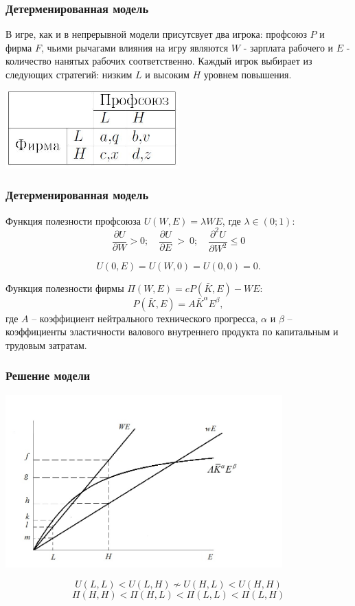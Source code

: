 \documentclass {beamer}
\begin{document}
\begin{frame}
	
	\frametitle{Детерменированная модель}
	
	В игре, как и в непрерывной модели присутсвует два игрока: профсоюз $P$ и фирма $F$, чьими рычагами влияния на игру являются $W$ - зарплата рабочего и $E$ - количество нанятых рабочих соответственно.
	Каждый игрок выбирает из следующих стратегий: низким $L$ и высоким $H$ уровнем повышения.
	\begin{center}
		\includegraphics[width=0.5\textwidth]{sixth}
	\end{center}
\end{frame}


\begin{frame}
	
	\frametitle{Детерменированная модель}
	Функция полезности профсоюза  $U(W,E)=\lambda WE$, где $\lambda \in(0;1)$:
	$$
	\frac{\partial U}{\partial W} > 0; 
	\quad 
	\frac{\partial U}{\partial E}~>~0 ; 
	\quad
	\frac{\partial^2 U}{\partial W^2} \leqslant 0
	$$
	
	$$
	U(0,E) = U(W,0) = U(0,0) = 0.
	$$
	
	
	Функция полезности фирмы $\Pi(W,E)=cP(\bar{K},E)-WE$:
	$$P(\bar{K}, E)=A\bar{K}^\alpha E^\beta,$$  где $A$ – коэффициент нейтрального технического прогресса, $\alpha$ и $\beta$ – коэффициенты эластичности валового внутреннего продукта по капитальным и трудовым затратам.\\
\end{frame}

\begin{frame}
	\frametitle{Решение модели}
 \begin{center}
 	\includegraphics[width=0.8\textwidth]{monopoly_union2}
 \end{center}
		$$U(L,L) < U(L,H) \nsim U(H, L) < U(H,H)$$
		$$\Pi(H,H) < \Pi(H,L) < \Pi(L, L) < \Pi(L,H)
		 $$

\end{frame}
\end{document}
